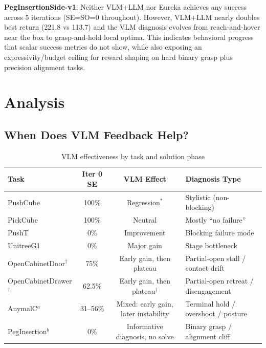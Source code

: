 \documentclass[conference]{IEEEtran}
\begin{document}
\textbf{PegInsertionSide-v1}: Neither VLM+LLM nor Eureka achieves any success
across 5 iterations (SE=SO=0 throughout). However, VLM+LLM nearly doubles best
return (221.8 vs 113.7) and the VLM diagnosis evolves from
reach-and-hover near the box to grasp-and-hold local optima. This indicates
behavioral progress that scalar success metrics do not show, while also exposing
an expressivity/budget ceiling for reward shaping on hard binary grasp plus
precision alignment tasks.


\section{Analysis}\label{sec:analysis}

\subsection{When Does VLM Feedback Help?}

\begin{table}[htbp]
\caption{VLM effectiveness by task and solution phase}
\label{tab:vlm_effectiveness}
\centering
\begin{tabular}{lccl}
\toprule
Task & Iter 0 SE & VLM Effect & Diagnosis Type \\
\midrule
PushCube & 100\% & Regression$^*$ & Stylistic (non-blocking) \\
PickCube & 100\% & Neutral & Mostly ``no failure'' \\
PushT & 0\% & Improvement & Blocking failure mode \\
UnitreeG1 & 0\% & Major gain & Stage bottleneck \\
OpenCabinetDoor$^\dagger$ & 75\% & Early gain, then plateau & Partial-open stall / contact drift \\
OpenCabinetDrawer$^\dagger$ & 62.5\% & Early gain, then plateau$^\ddagger$ & Partial-open retreat / disengagement \\
AnymalC$^a$ & 31--56\% & Mixed: early gain, later instability & Terminal hold / overshoot / posture \\
PegInsertion$^b$ & 0\% & Informative diagnosis, no solve & Binary grasp / alignment cliff \\
\bottomrule
\end{tabular}
\end{table}

\end{document}
